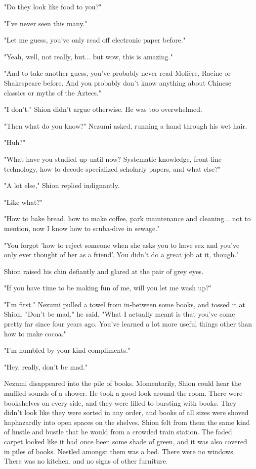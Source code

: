 "Do they look like food to you?"

"I've never seen this many."

"Let me guess, you've only read off electronic paper before."

"Yeah, well, not really, but... but wow, this is amazing."

"And to take another guess, you've probably never read Molière, Racine
or Shakespeare before. And you probably don't know anything about
Chinese classics or myths of the Aztecs."

"I don't." Shion didn't argue otherwise. He was too overwhelmed.

"Then what do you know?" Nezumi asked, running a hand through his wet
hair.

"Huh?"

"What have you studied up until now? Systematic knowledge, front-line
technology, how to decode specialized scholarly papers, and what else?"

"A lot else," Shion replied indignantly.

"Like what?"

"How to bake bread, how to make coffee, park maintenance and cleaning...
not to mention, now I know how to scuba-dive in sewage."

"You forgot 'how to reject someone when she asks you to have sex and
you've only ever thought of her as a friend'. You didn't do a great job
at it, though."

Shion raised his chin defiantly and glared at the pair of grey eyes.

"If you have time to be making fun of me, will you let me wash up?"

"I'm first." Nezumi pulled a towel from in-between some books, and
tossed it at Shion. "Don't be mad," he said. "What I actually meant is
that you've come pretty far since four years ago. You've learned a lot
more useful things other than how to make cocoa."

"I'm humbled by your kind compliments."

"Hey, really, don't be mad."

Nezumi disappeared into the pile of books. Momentarily, Shion could hear
the muffled sounds of a shower. He took a good look around the room.
There were bookshelves on every side, and they were filled to bursting
with books. They didn't look like they were sorted in any order, and
books of all sizes were shoved haphazardly into open spaces on the
shelves. Shion felt from them the same kind of hustle and bustle that he
would from a crowded train station. The faded carpet looked like it had
once been some shade of green, and it was also covered in piles of
books. Nestled amongst them was a bed. There were no windows. There was
no kitchen, and no signs of other furniture.

